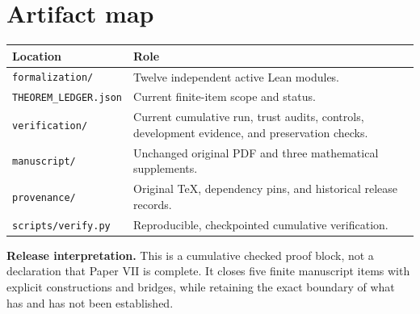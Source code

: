 \documentclass[10pt,letterpaper]{article}
\newcommand{\code}[1]{\texttt{\small #1}}
\begin{document}
\section*{Artifact map}
\begin{center}
\renewcommand{\arraystretch}{1.25}
\begin{tabularx}{\linewidth}{@{}lX@{}}
\toprule
Location & Role\\
\midrule
\code{formalization/} & Twelve independent active Lean modules.\\
\code{THEOREM\_LEDGER.json} & Current finite-item scope and status.\\
\code{verification/} & Current cumulative run, trust audits, controls, development evidence, and preservation checks.\\
\code{manuscript/} & Unchanged original PDF and three mathematical supplements.\\
\code{provenance/} & Original TeX, dependency pins, and historical release records.\\
\code{scripts/verify.py} & Reproducible, checkpointed cumulative verification.\\
\bottomrule
\end{tabularx}
\end{center}

\textbf{Release interpretation.} This is a cumulative checked proof block, not a declaration that Paper VII is complete. It closes five finite manuscript items with explicit constructions and bridges, while retaining the exact boundary of what has and has not been established.
\end{document}
